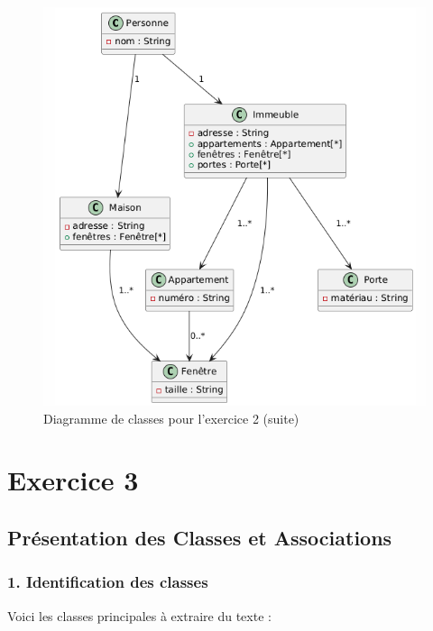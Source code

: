 \documentclass{article}
\begin{document}
\begin{figure}[H]
  \centering
  \includegraphics[width=\textwidth]{exo2-2.png}
  \caption{Diagramme de classes pour l'exercice 2 (suite)}
\end{figure}

\section*{Exercice 3}

\subsection*{Présentation des Classes et Associations}

\subsubsection*{1. Identification des classes}

Voici les classes principales à extraire du texte :
\end{document}
